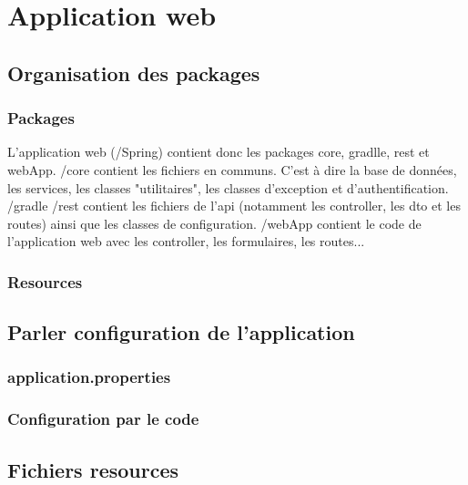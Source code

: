 \chapter{Application web}

	\section{Organisation des packages}

		\subsection{Packages}

			L'application web (/Spring) contient donc les packages core, gradlle, rest et webApp.
			/core contient les fichiers en communs. C'est à dire la base de données, les services, les classes "utilitaires", les classes d'exception et d'authentification.
			/gradle
			/rest contient les fichiers de l'api (notamment les controller, les dto et les routes) ainsi que les classes de configuration.
			/webApp contient le code de l'application web avec les controller, les formulaires, les routes...

		\subsection{Resources}


	\section{Parler configuration de l'application}

		\subsection{application.properties}


		\subsection{Configuration par le code}


	\section{Fichiers resources}

